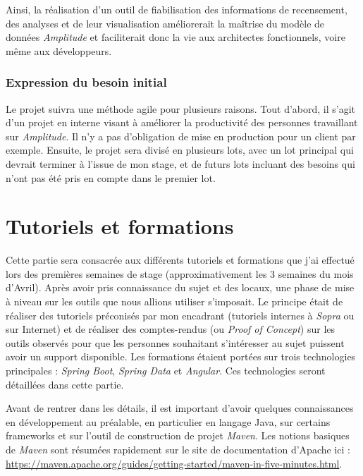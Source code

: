 \documentclass{polytech/polytech}
\begin{document}
Ainsi, la réalisation d’un outil de fiabilisation des informations de recensement, des analyses et de leur visualisation améliorerait la maîtrise du modèle de données \textit{Amplitude} et faciliterait donc la vie aux architectes fonctionnels, voire même aux développeurs.


\section{Expression du besoin initial}





Le projet suivra une méthode agile pour plusieurs raisons. Tout d'abord, il s'agit d'un projet en interne visant à améliorer la productivité des personnes travaillant sur \textit{Amplitude}. Il n'y a pas d'obligation de mise en production pour un client par exemple. Ensuite, le projet sera divisé en plusieurs lots, avec un lot principal qui devrait terminer à l'issue de mon stage, et de futurs lots incluant des besoins qui n'ont pas été pris en compte dans le premier lot.  


\part{Tutoriels et formations}


Cette partie sera consacrée aux différents tutoriels et formations que j'ai effectué lors des premières semaines de stage (approximativement les 3 semaines du mois d'Avril). Après avoir pris connaissance du sujet et des locaux, une phase de mise à niveau sur les outils que nous allions utiliser s'imposait. Le principe était de réaliser des tutoriels préconisés par mon encadrant (tutoriels internes à \textit{Sopra} ou sur Internet) et de réaliser des comptes-rendus (ou \textit{Proof of Concept}) sur les outils observés pour que les personnes souhaitant s'intéresser au sujet puissent avoir un support disponible. Les formations étaient portées sur trois technologies principales : \textit{Spring Boot}, \textit{Spring Data} et \textit{Angular}. Ces technologies seront détaillées dans cette partie.

Avant de rentrer dans les détails, il est important d'avoir quelques connaissances en développement au préalable, en particulier en langage Java, sur certains frameworks et sur l'outil de construction de projet \textit{Maven}. Les notions basiques de \textit{Maven} sont résumées rapidement sur le site de documentation d'Apache ici : \url{https://maven.apache.org/guides/getting-started/maven-in-five-minutes.html}.
\end{document}
